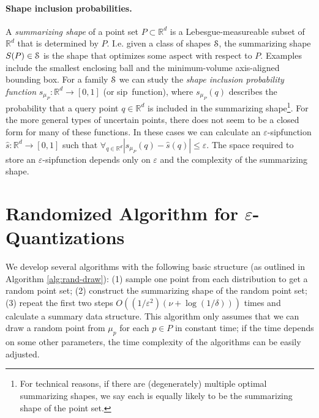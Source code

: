 \documentclass{journal}
\newcommand{\eps}{\varepsilon}
\newcommand{\Eu}[1]{\ensuremath{\EuScript{#1}}}
\newcommand{\R}{\ensuremath{\mathbb{R}}}
\newcommand{\sip}{\textsf{sip\xspace}}
\begin{document}
\paragraph{Shape inclusion probabilities.}
A \emph{summarizing shape} of a point set $P \subset \R^d$ is a Lebesgue-measureable subset of $\R^d$ that is determined by $P$.  I.e. given a class of shapes $\Eu{S}$, the summarizing shape $S(P) \in \Eu{S}$ is the shape that optimizes some aspect with respect to $P$.
Examples include the smallest enclosing ball and the minimum-volume axis-aligned bounding box.
For a family $\Eu{S}$ we can study the \emph{shape inclusion probability function} $s_{\mu_P} : \R^d \to [0,1]$ (or \sip\ function), where $s_{\mu_P}(q)$ describes the probability that a query point $q \in \R^d$ is included in the summarizing shape\footnote{For technical reasons, if there are (degenerately) multiple optimal summarizing shapes, we say each is equally likely to be the summarizing shape of the point set.}.
For the more general types of uncertain points, there does not seem to be a closed form for many of these functions.
In these cases we can calculate an $\eps$-\sip function $\hat{s} : \R^d \to [0,1]$ such that
$
\forall_{q \in \R^d} \left| s_{\mu_P}(q) - \hat{s}(q) \right| \leq \eps.
$
The space required to store an $\eps$-\sip function depends only on $\eps$ and the complexity of the summarizing shape.

































\section{Randomized Algorithm for $\eps$-Quantizations}
\label{sec:rand-eQ}

We develop several algorithms with the following basic structure (as outlined in Algorithm \ref{alg:rand-draw}):
(1) sample one point from each distribution to get a random point set;
(2) construct the summarizing shape of the random point set;
(3) repeat the first two steps $O((1/\eps^2)(\nu + \log(1/\delta)))$ times and calculate a summary data structure.
This algorithm only assumes that we can draw a random point from $\mu_p$ for each $p \in P$ in constant time; if the time depends on some other parameters, the time complexity of the algorithms can be easily adjusted.
\end{document}
